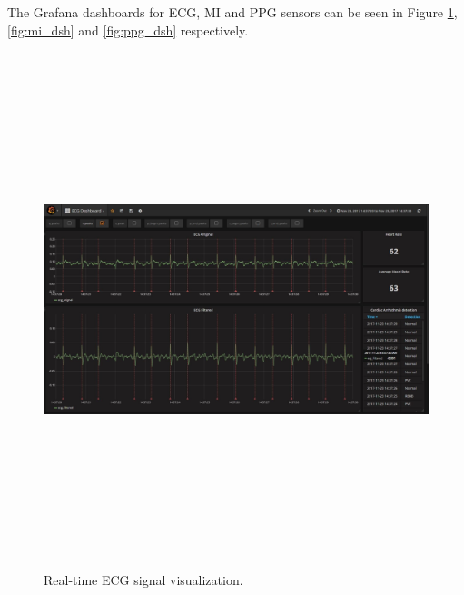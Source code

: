 The Grafana dashboards for ECG, MI and PPG sensors can be seen in Figure \ref{fig:ecg_dsh}, \ref{fig:mi_dsh} and \ref{fig:ppg_dsh} respectively.


\begin{figure}[htpb]
	\centering
	\includegraphics[width=16cm,height=15cm,keepaspectratio=true]{images/ecg_dsh}
	\caption{
		Real-time ECG signal visualization.
	}
	\label{fig:ecg_dsh}
\end{figure}

